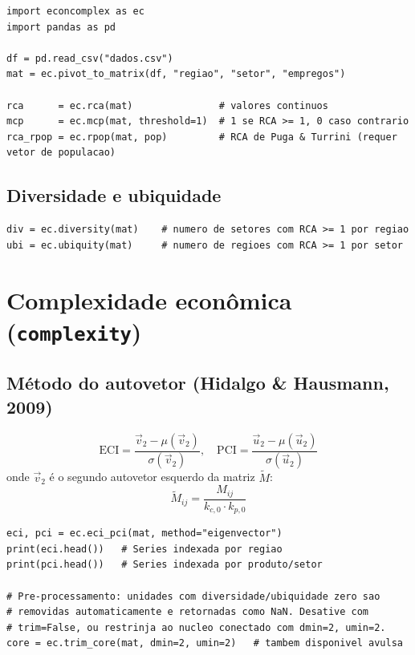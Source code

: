 \documentclass[12pt, a4paper]{article}
\begin{document}
\begin{lstlisting}[caption={RCA cont\'{i}nuo e bin\'{a}rio}]
import econcomplex as ec
import pandas as pd

df = pd.read_csv("dados.csv")
mat = ec.pivot_to_matrix(df, "regiao", "setor", "empregos")

rca      = ec.rca(mat)               # valores continuos
mcp      = ec.mcp(mat, threshold=1)  # 1 se RCA >= 1, 0 caso contrario
rca_rpop = ec.rpop(mat, pop)         # RCA de Puga & Turrini (requer vetor de populacao)
\end{lstlisting}

\subsection{Diversidade e ubiquidade}

\begin{lstlisting}[caption={Diversidade e ubiquidade}]
div = ec.diversity(mat)    # numero de setores com RCA >= 1 por regiao
ubi = ec.ubiquity(mat)     # numero de regioes com RCA >= 1 por setor
\end{lstlisting}

\section{Complexidade econ\^{o}mica (\texttt{complexity})}

\subsection{M\'{e}todo do autovetor (Hidalgo \& Hausmann, 2009)}

\[
  \text{ECI} = \frac{\vec{v}_2 - \mu(\vec{v}_2)}{\sigma(\vec{v}_2)}, \quad
  \text{PCI} = \frac{\vec{u}_2 - \mu(\vec{u}_2)}{\sigma(\vec{u}_2)}
\]
onde $\vec{v}_2$ \'{e} o segundo autovetor esquerdo da matriz $\tilde{M}$:
\[
  \tilde{M}_{ij} = \frac{M_{ij}}{k_{c,0} \cdot k_{p,0}}
\]

\begin{lstlisting}[caption={ECI e PCI pelo m\'{e}todo do vetor pr\'{o}prio}]
eci, pci = ec.eci_pci(mat, method="eigenvector")
print(eci.head())   # Series indexada por regiao
print(pci.head())   # Series indexada por produto/setor

# Pre-processamento: unidades com diversidade/ubiquidade zero sao
# removidas automaticamente e retornadas como NaN. Desative com
# trim=False, ou restrinja ao nucleo conectado com dmin=2, umin=2.
core = ec.trim_core(mat, dmin=2, umin=2)   # tambem disponivel avulsa
\end{lstlisting}
\end{document}
